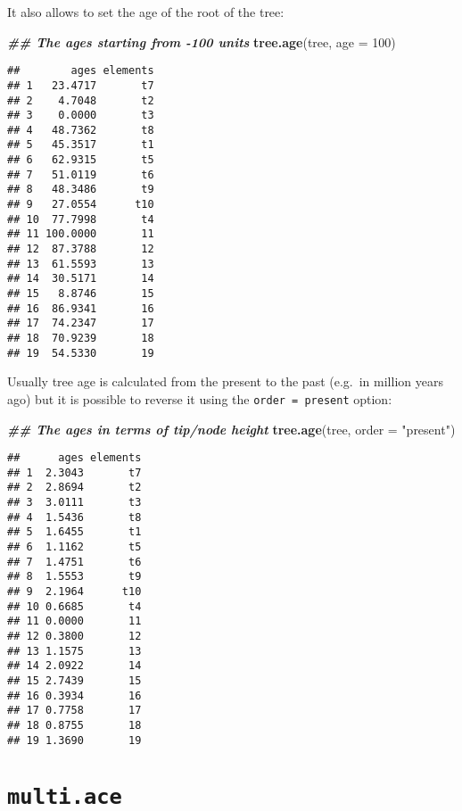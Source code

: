 \documentclass[
]{book}
\newenvironment{Shaded}{\begin{snugshade}}{\end{snugshade}}
\newcommand{\AttributeTok}[1]{\textcolor[rgb]{0.13,0.29,0.53}{#1}}
\newcommand{\DecValTok}[1]{\textcolor[rgb]{0.00,0.00,0.81}{#1}}
\newcommand{\DocumentationTok}[1]{\textcolor[rgb]{0.56,0.35,0.01}{\textbf{\textit{#1}}}}
\newcommand{\FunctionTok}[1]{\textcolor[rgb]{0.13,0.29,0.53}{\textbf{#1}}}
\newcommand{\NormalTok}[1]{#1}
\newcommand{\StringTok}[1]{\textcolor[rgb]{0.31,0.60,0.02}{#1}}
\begin{document}
It also allows to set the age of the root of the tree:

\begin{Shaded}
\begin{Highlighting}[]
\DocumentationTok{\#\# The ages starting from {-}100 units}
\FunctionTok{tree.age}\NormalTok{(tree, }\AttributeTok{age =} \DecValTok{100}\NormalTok{)}
\end{Highlighting}
\end{Shaded}

\begin{verbatim}
##        ages elements
## 1   23.4717       t7
## 2    4.7048       t2
## 3    0.0000       t3
## 4   48.7362       t8
## 5   45.3517       t1
## 6   62.9315       t5
## 7   51.0119       t6
## 8   48.3486       t9
## 9   27.0554      t10
## 10  77.7998       t4
## 11 100.0000       11
## 12  87.3788       12
## 13  61.5593       13
## 14  30.5171       14
## 15   8.8746       15
## 16  86.9341       16
## 17  74.2347       17
## 18  70.9239       18
## 19  54.5330       19
\end{verbatim}

Usually tree age is calculated from the present to the past (e.g.~in million years ago) but it is possible to reverse it using the \texttt{order\ =\ present} option:

\begin{Shaded}
\begin{Highlighting}[]
\DocumentationTok{\#\# The ages in terms of tip/node height}
\FunctionTok{tree.age}\NormalTok{(tree, }\AttributeTok{order =} \StringTok{"present"}\NormalTok{)}
\end{Highlighting}
\end{Shaded}

\begin{verbatim}
##      ages elements
## 1  2.3043       t7
## 2  2.8694       t2
## 3  3.0111       t3
## 4  1.5436       t8
## 5  1.6455       t1
## 6  1.1162       t5
## 7  1.4751       t6
## 8  1.5553       t9
## 9  2.1964      t10
## 10 0.6685       t4
## 11 0.0000       11
## 12 0.3800       12
## 13 1.1575       13
## 14 2.0922       14
## 15 2.7439       15
## 16 0.3934       16
## 17 0.7758       17
## 18 0.8755       18
## 19 1.3690       19
\end{verbatim}

\hypertarget{multi.ace}{%
\section{\texorpdfstring{\texttt{multi.ace}}{multi.ace}}\label{multi.ace}}
\end{document}
